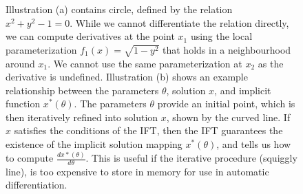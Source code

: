 \documentclass[11pt]{article}
\begin{document}
\begin{figure}
\centering
\begin{subfigure}[b]{0.45\textwidth}
\centering
{}
\caption{}
\end{subfigure}
\begin{subfigure}[b]{0.45\textwidth}
\centering
{}
\caption{}
\end{subfigure}
\caption{
\label{fig:circle}
Illustration (a) contains circle, defined by the relation $x^2 + y^2 - 1 = 0$.
While we cannot differentiate the relation directly,
we can compute derivatives at the point $x_1$ using the local parameterization $f_1(x)=\sqrt{1-y^2}$ that holds
in a neighbourhood around $x_1$.
We cannot use the same parameterization at $x_2$ as the derivative is undefined.
Illustration (b) shows an example relationship between the parameters $\theta$,
solution $x$, and implicit function $x^*(\theta)$.
The parameters $\theta$ provide an initial point, which is then iteratively refined
into solution $x$, shown by the curved line.
If $x$ satisfies the conditions of the IFT, then the IFT guarantees the
existence of the implicit solution mapping $x^*(\theta)$,
and tells us how to compute $\frac{dx*(\theta)}{d\theta}$.
This is useful if the iterative procedure (squiggly line), is too expensive
to store in memory for use in automatic differentiation.
}
\end{figure}
\end{document}
